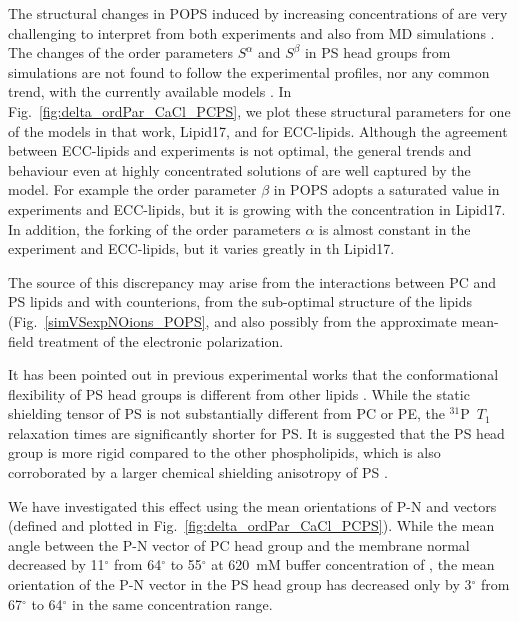 \documentclass[journal=jpcbfk,manuscript=article]{achemso}
\begin{document}
The structural changes in POPS induced by increasing concentrations of  
are very challenging to interpret from both experiments \cite{roux90} 
and also from MD simulations \cite{nmrlipids_proj4}. 
The changes of the order parameters $S^\alpha$ and $S^\beta$ in PS head groups from simulations 
are not found to follow the experimental profiles, 
nor any common trend,
with the currently available models \cite{nmrlipids_proj4}. 
In Fig.~\ref{fig:delta_ordPar_CaCl_PCPS},
we plot these structural parameters for one of the models in that work, Lipid17, 
and for ECC-lipids. 
Although the agreement between ECC-lipids and experiments is not optimal,
the general trends and behaviour even at highly concentrated solutions of  
are well captured by the model. 
For example the order parameter $\beta$ in POPS 
adopts a saturated value in experiments and ECC-lipids,
but it is growing with the  concentration in Lipid17.
In addition, 
the forking of the order parameters $\alpha$ 
is almost constant in the experiment and ECC-lipids,
but it varies greatly in th Lipid17. 

The source of this discrepancy may arise from the interactions between PC and PS lipids and with  counterions,
from the sub-optimal structure of the lipids (Fig.~\ref{simVSexpNOions_POPS},
and also possibly from the approximate mean-field treatment of the electronic polarization. 






It has been pointed out in previous experimental works
that the conformational flexibility of PS head groups 
is different from other lipids \cite{browning80}. 
While the static shielding tensor of PS is not substantially different from PC or PE, 
the $^{31}$P~$T_1$ relaxation times are significantly shorter for PS. 
It is suggested that the PS head group is more rigid compared to the other phospholipids, 
which is also corroborated by a larger chemical shielding anisotropy of PS \cite{browning80}. 

We have investigated this effect using the mean orientations of P-N and  vectors 
(defined and plotted in Fig.~\ref{fig:delta_ordPar_CaCl_PCPS}). 
While the mean angle between the P-N vector of PC head group and the membrane normal
decreased by 11$^\circ$ from 64$^\circ$ to 55$^\circ$
 at 620~mM buffer concentration of ,
the mean orientation of the P-N vector in the PS head group has 
decreased only by 3$^\circ$ from 67$^\circ$ to 64$^\circ$ 
in the same concentration range. 
\end{document}
